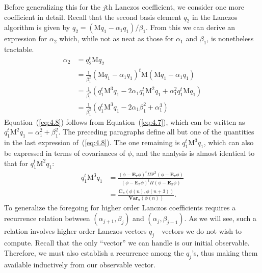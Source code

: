 \documentclass[12pt,letterpaper]{report}
\theoremstyle{plain}
\theoremstyle{definition}
\theoremstyle{remark}
\numberwithin{theorem}{chapter}
\numberwithin{claim}{chapter}
\numberwithin{equation}{chapter}
\numberwithin{conjecture}{chapter}
\newcommand\bC{\ensuremath{\mathbf{C}}}
\renewcommand\P{\ensuremath{\mathrm{P}}}
\newcommand\M{\ensuremath{\mathrm{M}}}
\newcommand\bE{\ensuremath{\mathbf{E}}}
\newcommand\Var{\ensuremath{\mathbf{Var}}}
\newcommand\<{\ensuremath{\langle}}
\renewcommand\>{\ensuremath{\rangle}}
\begin{document}
Before generalizing this for the $j$th Lanczos coefficient, we consider one more coefficient
in detail. Recall that the second basis element $q_2$ in the Lanczos algorithm is given by 
$q_2 = (\M q_1 - \alpha_1 q_1)/\beta_1$. 
From this we can derive an expression for $\alpha_2$ which, while not as neat as those
%
%
%
%
for $\alpha_1$ and $\beta_1$, is nonetheless tractable.
\begin{align}
\label{eq:4.8}
\alpha_2 &= q_2^t \M q_2 \nonumber\\
&= \frac{1}{\beta_1^2}(\M q_1 - \alpha_1 q_1)^t\M (\M q_1 - \alpha_1 q_1)\nonumber\\
&= \frac{1}{\beta_1^2}(q_1^t\M^3 q_1 - 2\alpha_1 q_1^t\M^2 q_1 + \alpha_1^2q_1^t\M q_1 )\nonumber\\
&= \frac{1}{\beta_1^2}(q_1^t\M^3 q_1 - 2\alpha_1 \beta_1^2 + \alpha_1^3 )
\end{align}
Equation~(\ref{eq:4.8}) follows from Equation~(\ref{eq:4.7}), which can be
written as $q_1^t\M^2 q_1 = \alpha_1^2 + \beta_1^2$.  
The preceding paragraphs define all but one of the quantities in the last
expression of~(\ref{eq:4.8}). The one remaining
is $q_1^t\M^3 q_1$, which can also be expressed in terms of covariances of $\phi$,
and the analysis is almost identical to that for $q_1^t\M^2q_1$:
\begin{align*}
q_1^t\M^3 q_1  &= \frac{(\phi - \bE_\pi\phi)^t\Pi \P^3(\phi- \bE_\pi \phi)}
{(\phi - \bE_\pi\phi)^t\Pi (\phi- \bE_\pi \phi)} \\[8pt]
&= \frac{\bC_\pi (\phi(n), \phi(n + 3))}{\Var_\pi(\phi(n))}.
\end{align*}
To generalize the foregoing for higher order Lanczos coefficients requires a recurrence
relation between $(\alpha_{j+1}, \beta_j)$ and $(\alpha_{j}, \beta_{j-1})$. 
As we will see, such a relation involves higher order
Lanczos vectors $q_j$---vectors we do not wish to compute. Recall that the only ``vector'' we can
handle is our initial observable. Therefore, we must also establish a recurrence
among the $q_j$'s, thus making them available inductively from our observable vector.
\end{document}
